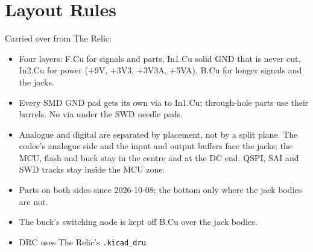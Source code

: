 \section{Layout Rules}
Carried over from The Relic:
\begin{itemize}
  \item Four layers: F.Cu for signals and parts, In1.Cu solid GND that is never cut, In2.Cu for power ($+$9V, $+$3V3, $+$3V3A, $+$5VA), B.Cu for longer signals and the jacks.
  \item Every SMD GND pad gets its own via to In1.Cu; through-hole parts use their barrels. No via under the SWD needle pads.
  \item Analogue and digital are separated by placement, not by a split plane. The codec's analogue side and the input and output buffers face the jacks; the MCU, flash and buck stay in the centre and at the DC end. QSPI, SAI and SWD tracks stay inside the MCU zone.
  \item Parts on both sides since 2026-10-08; the bottom only where the jack bodies are not.
  \item The buck's switching node is kept off B.Cu over the jack bodies.
  \item DRC uses The Relic's \texttt{.kicad\_dru}.
\end{itemize}
